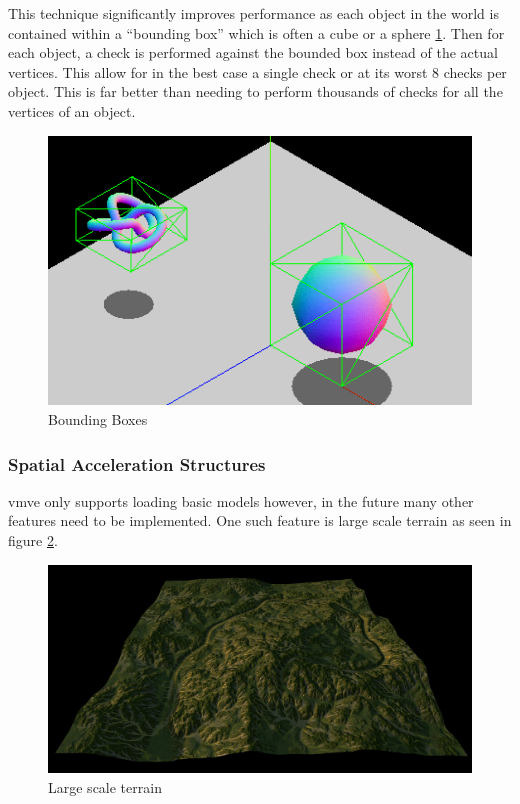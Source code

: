 \documentclass[11pt]{article}
\begin{document}
This technique significantly improves performance as each object in the world is
contained within a ``bounding box'' which is often a cube or a sphere
\ref{fig:bounding_boxes}. Then for each object, a check is performed against the
bounded box instead of the actual vertices. This allow for in the best case a
single check or at its worst 8 checks per object. This is far better than
needing to perform thousands of checks for all the vertices of an object.

\begin{figure}[h!]
  \centering
  \includegraphics[width=\textwidth]{images/bounding_boxes.png}
  \caption{Bounding Boxes \cite{bounding_boxes}}
  \label{fig:bounding_boxes}
\end{figure}


\subsubsection{Spatial Acceleration Structures}
\gls{vmve} only supports loading basic models however, in the future many other
features need to be implemented. One such feature is large scale terrain as seen
in figure \ref{fig:quad_tree_terrain}.

\begin{figure}[h!]
  \centering
  \includegraphics[width=\textwidth]{images/quad_tree_terrain.png}
  \caption{Large scale terrain}
  \label{fig:quad_tree_terrain}
\end{figure}
\end{document}
